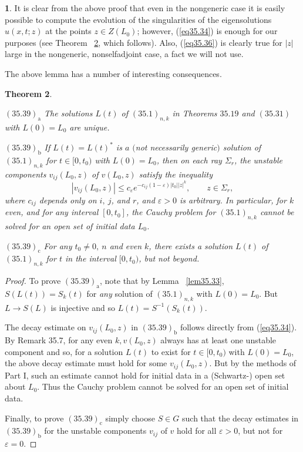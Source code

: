 \documentclass{surv-l}
\theoremstyle{plain}
\newtheorem{theorem}{Theorem}[section]
\theoremstyle{definition}
\newtheorem{remark}[theorem]{\sc{Remark}}
\numberwithin{equation}{chapter}
\begin{document}
\setcounter{theorem}{37}
\begin{remark}\label{rem35.38}
It is clear from the above proof that even in the nongeneric case it is easily possible to compute the evolution of the singularities of the eigensolutions $u(x, t;z)$ at the points $z\in Z(L_{0})$; however, (\ref{eq35.34}) is enough for our purposes (see Theorem ~\ref{thm35.39}, which follows). Also, (\ref{eq35.36}) is clearly true for $|z|$ large in the nongeneric, nonselfadjoint case, a fact we will not use.
\end{remark}

The above lemma has a number of interesting consequences.

\begin{theorem}\label{thm35.39}

$(35.39)_{\mathrm{a}}$ The solutions $L(t)$ of $(35.1)_{n, k}$ in
Theorems $35.19$ and $(35.31)$ with $L(0)=L_{0}$ are unique.

$(35.39)_{\mathrm{b}}$ If $L(t)=L(t)^{*}$ is $a$ $($not necessarily generic$)$ solution of $(35.1)_{n,k}$ for $t\in[0, t_{0})$ with $L(0)=L_{0}$, then on each ray $\Sigma_{r}$, the unstable components $v_{ij}(L_{0}, z)$ of $v(L_{0}, z)$ satisfy the inequality
\begin{equation*}
|v_{ij}(L_{0}, z)|\leq c_{\varepsilon}e^{-c_{ij}(1-\varepsilon)|t_{0}||z|^{k}},\qquad z\in\Sigma_{r},
\end{equation*}
where $c_{ij}$ depends only on $i,\ j$, and $r$, and $\varepsilon >0$ is arbitrary. In particular, for $k$ even, and for any interval $[0, t_{0}]$, the Cauchy problem for $(35.1)_{n,k}$ cannot be solved for an open set of initial data $L_{0}$.

$(35.39)_{\mathrm{c}}$ For any $t_{0}\neq 0,\ n$ and even $k$, there exists a solution $L(t)$ of $(35.1)_{n,k}$ for $t$ in the interval $[0, t_{0})$, but not beyond.
\end{theorem}
\begin{proof}
To prove $(35.39)_{\mathrm{a}}$, note that by Lemma ~\ref{lem35.33}, $S(L(t))=S_{k}(t)$ for \emph{any} solution of $(35.1)_{n,k}$ with $L(0)=L_{0}$. But $L\rightarrow S(L)$ is injective and so $L(t)=S^{-1}(S_{k}(t))$.

The decay estimate on $v_{ij}(L_{0}, z)$ in $(35.39)_{\mathrm{b}}$ follows directly from (\ref{eq35.34}). By Remark 35.7, for any even $k,v(L_{0}, z)$ always has at least one unstable component and so, for a solution $L(t)$ to exist for $t\in[0,t_{0})$ with $L(0)=L_{0}$, the above decay estimate must hold for some $v_{ij}(L_{0}, z)$. But by the methods of Part I, such an estimate cannot hold for initial data in a (Schwartz-) open set about $L_{0}$. Thus the Cauchy problem cannot be solved for an open set of initial data.

Finally, to prove $(35.39)_{\mathrm{c}}$ simply choose $S\in G$ such that the decay estimates in $(35.39)_{\mathrm{b}}$ for the unstable components $v_{ij}$ of $v$ hold for all $\varepsilon >0$, but not for $\varepsilon =0$.\quad
\end{proof}
\end{document}
